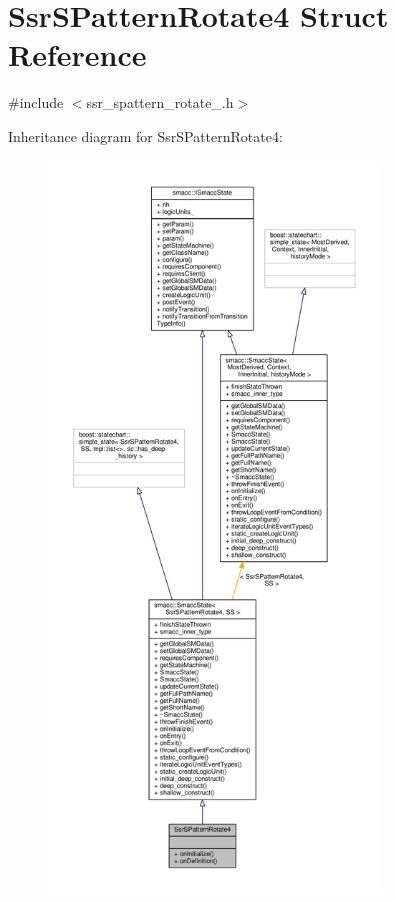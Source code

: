\hypertarget{structSsrSPatternRotate4}{}\section{Ssr\+S\+Pattern\+Rotate4 Struct Reference}
\label{structSsrSPatternRotate4}


{\ttfamily \#include $<$ssr\+\_\+spattern\+\_\+rotate\+\_.\+h$>$}



Inheritance diagram for Ssr\+S\+Pattern\+Rotate4\+:
\nopagebreak
\begin{figure}[H]
\begin{center}
\leavevmode
\includegraphics[height=550pt]{structSsrSPatternRotate4__inherit__graph}
\end{center}
\end{figure}


